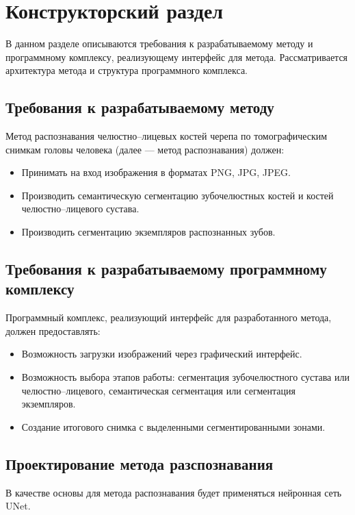 \section{Конструкторский раздел}

В данном разделе описываются требования к разрабатываемому методу и программному комплексу, реализующему интерфейс для метода. Рассматривается архитектура метода и структура программного комплекса.

\subsection{Требования к разрабатываемому методу}

Метод распознавания челюстно--лицевых костей черепа по томографическим снимкам головы человека (далее --- метод распознавания) должен:
\begin{itemize}
	\item Принимать на вход изображения в форматах PNG, JPG, JPEG.
	\item Производить семантическую сегментацию зубочелюстных костей и костей челюстно--лицевого сустава.
	\item Производить сегментацию экземпляров распознанных зубов.
\end{itemize}

\subsection{Требования к разрабатываемому программному комплексу}

Программный комплекс, реализующий интерфейс для разработанного метода, должен предоставлять:
\begin{itemize}
	\item Возможность загрузки изображений через графический интерфейс.
	\item Возможность выбора этапов работы: сегментация зубочелюстного сустава или челюстно--лицевого, семантическая сегментация или сегментация экземпляров.
	\item Создание итогового снимка с выделенными сегментированными зонами.
\end{itemize}

\subsection{Проектирование метода разспознавания}

В качестве основы для метода распознавания будет применяться нейронная сеть UNet.

